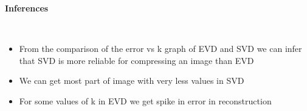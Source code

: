 \documentclass[12pt]{article}
\begin{document}
\begin{enumerate}
\begin{center}
		\end{center}
	\\
		\begin{itemize}
		\item From the comparison of the error vs k graph of EVD and SVD we can infer that SVD is more reliable for compressing an image than EVD
		\item We can get most part of image with very less values in SVD
		\item For some values of k in EVD we get spike in error in reconstruction
		\end{itemize}
\end{enumerate}
\end{document}
